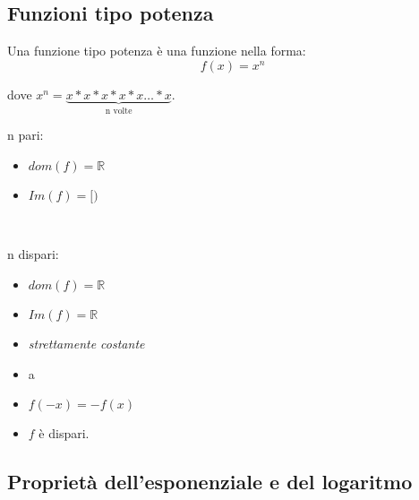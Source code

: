 \documentclass[../main.tex, class=article]{subfiles}
\begin{document}
\subsection{Funzioni tipo potenza}\label{sec:funzioni_tipo_potenza}
Una funzione tipo potenza è una funzione nella forma:
\begin{equation*}
        f(x) = x^n
\end{equation*}

dove $ x^n = \underbrace{x*x*x*x*x\ldots*x}_\text{n volte} $.


\begin{procol}{2}

n pari:
\begin{itemize}
        \item $ dom(f) = \mathbb{R} $
        \item $ Im(f) = [) $
\end{itemize}
        
\switchcolumn\

n dispari:
\begin{itemize}
        \item $ dom(f) = \mathbb{R} $
        \item $ Im(f) = \mathbb{R} $
        \item \textit{strettamente costante}
        \item  a 
        \item $f(-x) = -f(x)$
        \item $ f $ è dispari.
\end{itemize}

\end{procol}








\subsection{Proprietà dell'esponenziale e del logaritmo}
\end{document}
